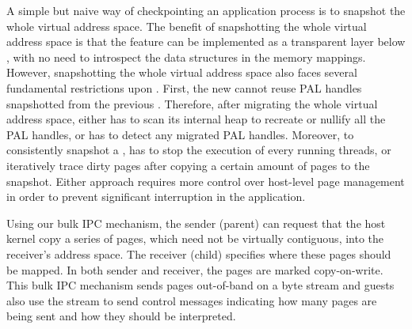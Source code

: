 A simple but naive way of checkpointing an application process
is to snapshot the whole virtual address space.
The benefit of snapshotting the whole virtual address space
is that the feature
can be implemented as a transparent layer below \thelibos{},
with no need to introspect the data structures in the \thelibos{} memory mappings.
However, snapshotting the whole virtual address space
also faces several fundamental restrictions upon \thehostabi{}.
First, the new \picoproc{} cannot reuse PAL handles snapshotted from the previous \picoproc{}.
Therefore, after migrating the whole virtual address space,
either \thelibos{} has to scan its internal heap to recreate or nullify all the PAL handles, or \thehostabi{} has to detect any migrated PAL handles.
Moreover, to consistently snapshot a \picoproc{},
\thelibos{} has to stop the execution of every running threads,
or iteratively trace dirty pages after copying a certain amount of pages to the snapshot.
Either approach requires more control over host-level page management
in order to prevent significant interruption in the application.








Using our bulk IPC mechanism,
the sender (parent) can request that the host kernel copy
a series of pages, which need not be virtually contiguous,
into the receiver's address space.
The receiver (child) specifies where these pages should be mapped.
In both sender and receiver, the pages are marked copy-on-write.  
This bulk IPC mechanism sends pages out-of-band on a byte stream and guests also use the stream to send control messages 
indicating 
how many pages are being sent and how they should be interpreted.

